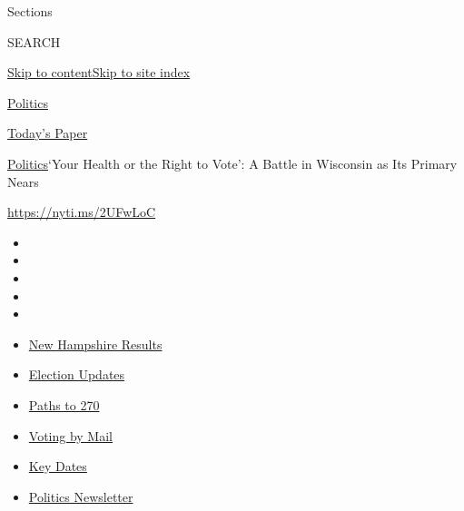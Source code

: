 Sections

SEARCH

\protect\hyperlink{site-content}{Skip to
content}\protect\hyperlink{site-index}{Skip to site index}

\href{https://www.nytimes3xbfgragh.onion/section/politics}{Politics}

\href{https://myaccount.nytimes3xbfgragh.onion/auth/login?response_type=cookie\&client_id=vi}{}

\href{https://www.nytimes3xbfgragh.onion/section/todayspaper}{Today's
Paper}

\href{/section/politics}{Politics}\textbar{}`Your Health or the Right to
Vote': A Battle in Wisconsin as Its Primary Nears

\url{https://nyti.ms/2UFwLoC}

\begin{itemize}
\item
\item
\item
\item
\item
\end{itemize}

\begin{itemize}
\item
  \href{https://www.nytimes3xbfgragh.onion/interactive/2020/09/08/us/elections/results-new-hampshire-primary-elections.html?action=click\&pgtype=Article\&state=default\&region=TOP_BANNER\&context=storylines_menu}{New
  Hampshire Results}
\item
  \href{https://www.nytimes3xbfgragh.onion/live/2020/09/08/us/trump-vs-biden?action=click\&pgtype=Article\&state=default\&region=TOP_BANNER\&context=storylines_menu}{Election
  Updates}
\item
  \href{https://www.nytimes3xbfgragh.onion/interactive/2020/us/elections/election-states-biden-trump.html?action=click\&pgtype=Article\&state=default\&region=TOP_BANNER\&context=storylines_menu}{Paths
  to 270}
\item
  \href{https://www.nytimes3xbfgragh.onion/interactive/2020/08/31/us/politics/vote-by-mail-deadlines.html?action=click\&pgtype=Article\&state=default\&region=TOP_BANNER\&context=storylines_menu}{Voting
  by Mail}
\item
  \href{https://www.nytimes3xbfgragh.onion/interactive/2019/us/elections/2020-presidential-election-calendar.html?action=click\&pgtype=Article\&state=default\&region=TOP_BANNER\&context=storylines_menu}{Key
  Dates}
\item
  \href{https://www.nytimes3xbfgragh.onion/newsletters/politics?action=click\&pgtype=Article\&state=default\&region=TOP_BANNER\&context=storylines_menu}{Politics
  Newsletter}
\end{itemize}

